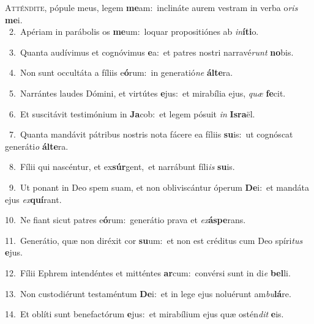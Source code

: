 \lettrine{\initial\textcolor{\initialcolor}{A}}{tténdite,} pópule meus, legem \textbf{me}\-am:~\star inclináte aurem vestram in verba o\textit{ris} \textbf{me}\-i.\\
{\numbfont\textcolor{\numbcolor}{~2.}}~Apériam in parábolis os \textbf{me}\-um:~\star loquar propositiónes ab \textit{in}\-\textbf{í}\textbf{ti}o.\par
{\numbfont\textcolor{\numbcolor}{~3.}}~Quanta audívimus et cognóvimus \textbf{e}\-a:~\star et patres nostri narravé\textit{runt} \textbf{no}\-bis.\par
{\numbfont\textcolor{\numbcolor}{~4.}}~Non sunt occultáta a fíliis e\-\textbf{ó}\-rum:~\star in generatió\textit{ne} \textbf{ál}\-\textbf{te}ra.\par
{\numbfont\textcolor{\numbcolor}{~5.}}~Narrántes laudes Dómini, et virtútes \textbf{e}\-jus:~\star et mirabília ejus, \textit{quæ} \textbf{fe}\-cit.\par
{\numbfont\textcolor{\numbcolor}{~6.}}~Et suscitávit testimónium in \textbf{Ja}\-cob:~\star et legem pósuit \textit{in} \textbf{Is}\-\textbf{ra}ël.\par
{\numbfont\textcolor{\numbcolor}{~7.}}~Quanta mandávit pátribus nostris nota fácere ea fíliis \textbf{su}\-is:~\star ut cognóscat generáti\textit{o} \textbf{ál}\-\textbf{te}ra.\par
{\numbfont\textcolor{\numbcolor}{~8.}}~Fílii qui nascéntur, et ex\-\textbf{súr}\-gent,~\star et narrábunt fíli\textit{is} \textbf{su}\-is.\par
{\numbfont\textcolor{\numbcolor}{~9.}}~Ut ponant in Deo spem suam, et non obliviscántur óperum \textbf{De}\-i:~\star et mandáta ejus \textit{ex}\-\textbf{quí}rant.\par
{\numbfont\textcolor{\numbcolor}{10.}}~Ne fiant sicut patres e\-\textbf{ó}\-rum:~\star generátio prava et \textit{ex}\-\textbf{ás}\textbf{pe}rans.\par
{\numbfont\textcolor{\numbcolor}{11.}}~Generátio, quæ non diréxit cor \textbf{su}\-um:~\star et non est créditus cum Deo spíri\textit{tus} \textbf{e}\-jus.\par
{\numbfont\textcolor{\numbcolor}{12.}}~Fílii Ephrem intendéntes et mitténtes \textbf{ar}\-cum:~\star convérsi sunt in di\textit{e} \textbf{bel}\-li.\par
{\numbfont\textcolor{\numbcolor}{13.}}~Non custodiérunt testaméntum \textbf{De}\-i:~\star et in lege ejus noluérunt am\-\textit{bu}\-\textbf{lá}re.\par
{\numbfont\textcolor{\numbcolor}{14.}}~Et oblíti sunt benefactórum \textbf{e}\-jus:~\star et mirabílium ejus quæ ostén\textit{dit} \textbf{e}\-is.\par
